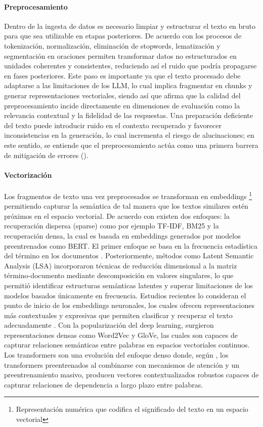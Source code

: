 \paragraph{Preprocesamiento} Dentro de la ingesta de datos es necesario limpiar y estructurar el texto en bruto para que sea utilizable en etapas posteriores. De acuerdo con \textcite{tabassum2020} los procesos de tokenización,
normalización, eliminación de stopwords, lematización y segmentación en oraciones permiten transformar datos no estructurados en unidades coherentes y consistentes, reduciendo así el ruido que podría propagarse en fases posteriores. 
Este paso es importante ya que el texto procesado debe adaptarse a las limitaciones de los LLM, lo cual implica fragmentar en chunks y generar representaciones vectoriales, siendo así que \textcite{knollmeyer2024benchmarking} 
afirma que la calidad del preprocesamiento incide directamente en dimensiones de evaluación como la relevancia contextual y la fidelidad de las respuestas. Una preparación deficiente del texto puede introducir ruido en el contexto recuperado 
y favorecer inconsistencias en la generación, lo cual incrementa el riesgo de alucinaciones; en este sentido, se entiende que el preprocesamiento actúa como una primera barrera de mitigación de errores (\textcite{zhang2025hallucination}).

\paragraph{Vectorización} Los fragmentos de texto una vez preprocesados se transforman en embeddings \footnote{Representación numérica que codifica el significado del texto en un espacio vectorial} permitiendo capturar la semántica de tal manera que 
los textos similares estén próximos en el espacio vectorial. De acuerdo con \textcite{hu2024ragrau} existen dos enfoques: la recuperación dispersa (sparse) como por ejemplo 
TF-IDF, BM25 y la recuperación densa, la cual es basada en embeddings generados por modelos preentrenados como BERT. El primer enfoque se basa en la frecuencia estadística del término en los documentos \parencite{fan2021pretraining}.
Posteriormente, métodos como Latent Semantic Analysis (LSA) incorporaron técnicas de reducción dimensional a la matriz término-documento mediante descomposición en valores singulares, lo que permitió identificar estructuras semánticas latentes y superar 
limitaciones de los modelos basados únicamente en frecuencia. Estudios recientes lo consideran el punto de inicio de los embeddings neuronales, los cuales ofrecen representaciones más contextuales y expresivas que permiten clasificar y recuperar el texto adecuadamente
\parencite{fan2021pretraining,minaee2021}. Con la popularización del deep learning, surgieron representaciones densas como Word2Vec y GloVe, las cuales son capaces de capturar relaciones semánticas entre palabras en espacios vectoriales continuos. Los transformers son una 
evolución del enfoque denso donde, según \textcite{casola2022pretrained}, los transformers preentrenados al combinarse con mecanismos de atención y un preentrenamiento masivo, producen vectores contextualizados robustos capaces de capturar relaciones de dependencia a largo
plazo entre palabras.

